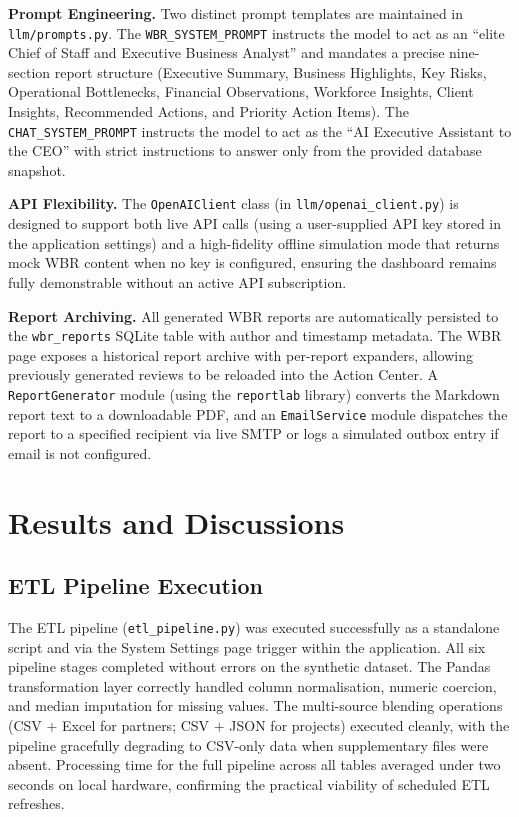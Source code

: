 \documentclass{book}
\begin{document}
\par\noindent
\textbf{Prompt Engineering.} Two distinct prompt templates are maintained in \texttt{llm/prompts.py}. The \texttt{WBR\_SYSTEM\_PROMPT} instructs the model to act as an ``elite Chief of Staff and Executive Business Analyst'' and mandates a precise nine-section report structure (Executive Summary, Business Highlights, Key Risks, Operational Bottlenecks, Financial Observations, Workforce Insights, Client Insights, Recommended Actions, and Priority Action Items). The \texttt{CHAT\_SYSTEM\_PROMPT} instructs the model to act as the ``AI Executive Assistant to the CEO'' with strict instructions to answer only from the provided database snapshot.

\par\noindent
\textbf{API Flexibility.} The \texttt{OpenAIClient} class (in \texttt{llm/openai\_client.py}) is designed to support both live API calls (using a user-supplied API key stored in the application settings) and a high-fidelity offline simulation mode that returns mock WBR content when no key is configured, ensuring the dashboard remains fully demonstrable without an active API subscription.

\par\noindent
\textbf{Report Archiving.} All generated WBR reports are automatically persisted to the \texttt{wbr\_reports} SQLite table with author and timestamp metadata. The WBR page exposes a historical report archive with per-report expanders, allowing previously generated reviews to be reloaded into the Action Center. A \texttt{ReportGenerator} module (using the \texttt{reportlab} library) converts the Markdown report text to a downloadable PDF, and an \texttt{EmailService} module dispatches the report to a specified recipient via live SMTP or logs a simulated outbox entry if email is not configured.




\chapter{Results and Discussions}

\section{ETL Pipeline Execution}
The ETL pipeline (\texttt{etl\_pipeline.py}) was executed successfully as a standalone script and via the System Settings page trigger within the application. All six pipeline stages completed without errors on the synthetic dataset. The Pandas transformation layer correctly handled column normalisation, numeric coercion, and median imputation for missing values. The multi-source blending operations (CSV $+$ Excel for partners; CSV $+$ JSON for projects) executed cleanly, with the pipeline gracefully degrading to CSV-only data when supplementary files were absent. Processing time for the full pipeline across all tables averaged under two seconds on local hardware, confirming the practical viability of scheduled ETL refreshes.
\end{document}
